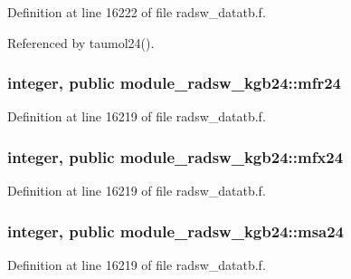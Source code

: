 Definition at line 16222 of file radsw\+\_\+datatb.\+f.



Referenced by taumol24().

\subsubsection[{\texorpdfstring{mfr24}{mfr24}}]{\setlength{\rightskip}{0pt plus 5cm}integer, public module\+\_\+radsw\+\_\+kgb24\+::mfr24}\hypertarget{namespacemodule__radsw__kgb24_a3a1c3808493ce89f2218116a02350e51}{}\label{namespacemodule__radsw__kgb24_a3a1c3808493ce89f2218116a02350e51}


Definition at line 16219 of file radsw\+\_\+datatb.\+f.

\subsubsection[{\texorpdfstring{mfx24}{mfx24}}]{\setlength{\rightskip}{0pt plus 5cm}integer, public module\+\_\+radsw\+\_\+kgb24\+::mfx24}\hypertarget{namespacemodule__radsw__kgb24_a6fcafb0e1605ad49a252ed1e22b00a5b}{}\label{namespacemodule__radsw__kgb24_a6fcafb0e1605ad49a252ed1e22b00a5b}


Definition at line 16219 of file radsw\+\_\+datatb.\+f.

\subsubsection[{\texorpdfstring{msa24}{msa24}}]{\setlength{\rightskip}{0pt plus 5cm}integer, public module\+\_\+radsw\+\_\+kgb24\+::msa24}\hypertarget{namespacemodule__radsw__kgb24_ad416df05aed8a6ae1ecd57d5c90c223c}{}\label{namespacemodule__radsw__kgb24_ad416df05aed8a6ae1ecd57d5c90c223c}


Definition at line 16219 of file radsw\+\_\+datatb.\+f.

